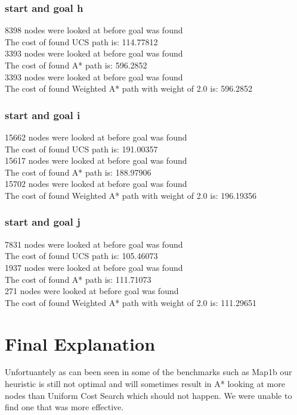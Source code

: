 \documentclass[11pt]{article} %
\begin{document}
\subsubsection{start and goal h}
8398 nodes were looked at before goal was found\\
The cost of found UCS path is: 114.77812\\
3393 nodes were looked at before goal was found\\
The cost of found A* path is: 596.2852\\
3393 nodes were looked at before goal was found\\
The cost of found Weighted A* path with weight of 2.0 is: 596.2852\\
\subsubsection{start and goal i}
15662 nodes were looked at before goal was found\\
The cost of found UCS path is: 191.00357\\
15617 nodes were looked at before goal was found\\
The cost of found A* path is: 188.97906\\
15702 nodes were looked at before goal was found\\
The cost of found Weighted A* path with weight of 2.0 is: 196.19356\\
\subsubsection{start and goal j}
7831 nodes were looked at before goal was found\\
The cost of found UCS path is: 105.46073\\
1937 nodes were looked at before goal was found\\
The cost of found A* path is: 111.71073\\
271 nodes were looked at before goal was found\\
The cost of found Weighted A* path with weight of 2.0 is: 111.29651\\

\section{Final Explanation}
Unfortuantely as can been seen in some of the benchmarks such as Map1b our heuristic is still not optimal and will sometimes result in A* looking at more nodes than Uniform Cost Search which should not happen. We were unable to find one that was more effective.
\end{document}
